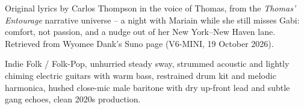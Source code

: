 
\begin{notes}
Original lyrics by Carlos Thompson in the voice of Thomas, from the \emph{Thomas' Entourage} narrative universe -- a night with Mariain while she still misses Gabi: comfort, not passion, and a nudge out of her New York--New Haven lane. Retrieved from Wyomee Dank's Suno page (V6-MINI, 19 October 2026).
\end{notes}
\begin{style}
Indie Folk / Folk-Pop, unhurried steady sway, strummed acoustic and lightly chiming electric guitars with warm bass, restrained drum kit and melodic harmonica, hushed close-mic male baritone with dry up-front lead and subtle gang echoes, clean 2020s production.
\end{style}
